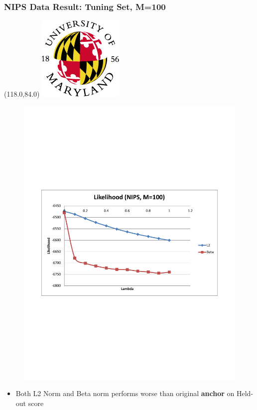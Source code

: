 \documentclass{beamer}
\let\oldframetitle\frametitle
\renewcommand{\frametitle}[1]{
\oldframetitle{#1}
\BottomLogo
}
\newcommand{\BottomLogo}{
\begin{textblock}{14}(118.0,84.0)
\includegraphics[height=.8cm]{figures/umd-logo1.jpg}
\end{textblock}
}
\begin{document}
\begin{frame}

\frametitle{NIPS Data Result: Tuning Set, M=100}

\begin{figure}
\includegraphics[width=0.7\linewidth]{figures/NIPS_M_100_Likelihood.pdf}
\end{figure}
\vspace{-0.1in}
\begin{itemize}
\item Both L2 Norm and Beta norm performs worse than original {\bf anchor} on Held-out score
\end{itemize}
\end{frame} 
\end{document}
